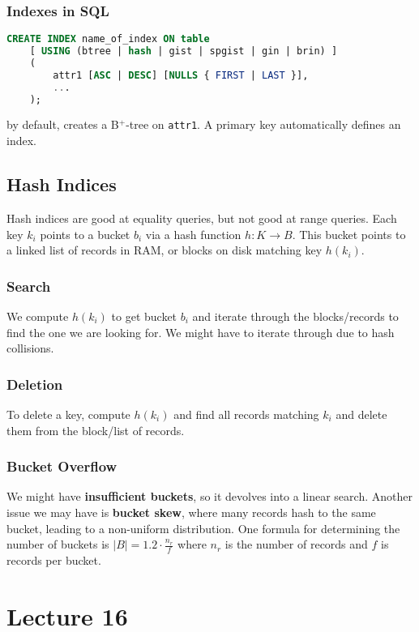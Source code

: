 \documentclass{report}
\renewcommand{\bf}[1]{\textbf{{#1}}}
\renewcommand{\tt}[1]{\texttt{{#1}}}
\begin{document}
\subsection{Indexes in SQL}
\begin{lstlisting}[language=SQL, style=colorEX]
    CREATE INDEX name_of_index ON table
    [ USING (btree | hash | gist | spgist | gin | brin) ]
    (
        attr1 [ASC | DESC] [NULLS { FIRST | LAST }],
        ...
    );
\end{lstlisting}
by default, creates a B$^+$-tree on \tt{attr1}. A primary key automatically defines an index.

\section{Hash Indices}
Hash indices are good at equality queries, but not good at range queries. Each
key $k_i$ points to a bucket $b_i$ via a hash function $h : K \to B$. This bucket points
to a linked list of records in RAM, or blocks on disk matching key $h(k_i)$.

\subsection{Search}
We compute $h(k_i)$ to get bucket $b_i$ and iterate through the blocks/records
to find the one we are looking for. We might have to iterate through due to hash
collisions.

\subsection{Deletion}
To delete a key, compute $h(k_i)$ and find all records matching $k_i$ and delete
them from the block/list of records.

\subsection{Bucket Overflow}
We might have \bf{insufficient buckets}, so it devolves into a linear search.
Another issue we may have is \bf{bucket skew}, where many records hash to the
same bucket, leading to a non-uniform distribution. One formula for determining
the number of buckets is $|B| = 1.2 \cdot \frac{n_r}{f}$ where $n_r$ is the
number of records and $f$ is records per bucket.


\chapter{Lecture 16}
\end{document}
